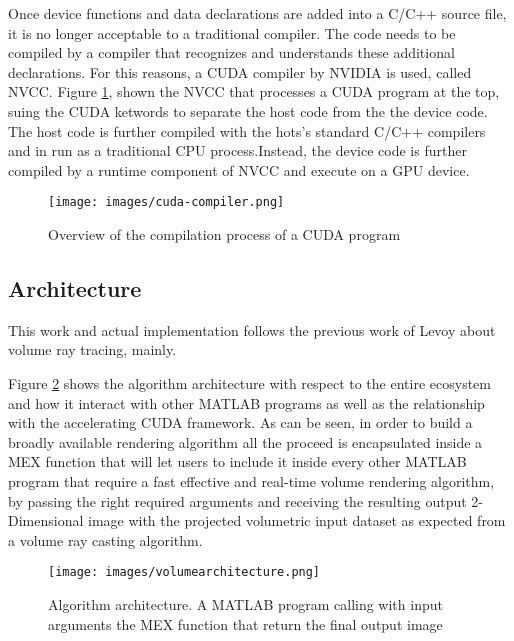 \documentclass[12pt,a4paper]{extarticle}
\begin{document}
Once device functions and data declarations are added into a C/C++ source file, it is no longer acceptable to a traditional compiler. The code needs to be compiled by a compiler that recognizes and understands these additional declarations. For this reasons, a CUDA compiler by NVIDIA is used, called NVCC.
Figure \ref{fig:cudacompiler}, shown the NVCC that processes a CUDA program at the top, suing the CUDA ketwords to separate the host code from the the device code. The host code is further compiled with the hots's standard C/C++ compilers and in run as a traditional CPU process.Instead, the device code is further compiled by a runtime component of NVCC and execute on a GPU device.
\begin{figure}[hbtp]
\centering
\texttt{[image: images/cuda-compiler.png]}
\caption{Overview of the compilation process of a CUDA program}
\label{fig:cudacompiler}
\end{figure}



\subsection{Architecture} 
This work and actual implementation follows the previous work of Levoy about volume ray tracing, mainly.

Figure \ref{fig:architecture} shows the algorithm architecture with respect to the entire ecosystem and how it interact with other MATLAB programs as well as the relationship with the accelerating CUDA framework. As can be seen, in order to build a broadly available rendering algorithm all the proceed is encapsulated inside a MEX function that will let users to include it inside every other MATLAB program that require a fast effective and real-time volume rendering algorithm, by passing the right required arguments and receiving the resulting output 2-Dimensional image with the projected volumetric input dataset as expected from a volume ray casting algorithm. %

\begin{figure}[hbtp]
\centering
\texttt{[image: images/volumearchitecture.png]}
\caption{Algorithm architecture. A MATLAB program calling with input arguments the MEX function that return the final output image}
\label{fig:architecture}
\end{figure}
\end{document}
